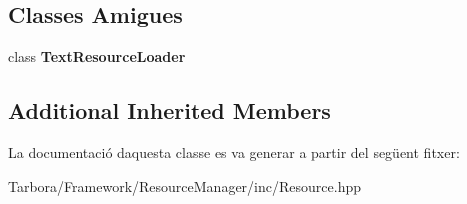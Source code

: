 \subsection*{Classes Amigues}
\begin{DoxyCompactItemize}
\item 
\mbox{\label{classTarbora_1_1TextResource_ad100d8767ed491d6e80636c2b83ac605}} 
class {\bfseries Text\+Resource\+Loader}
\end{DoxyCompactItemize}
\subsection*{Additional Inherited Members}


La documentació d\textquotesingle{}aquesta classe es va generar a partir del següent fitxer\+:\begin{DoxyCompactItemize}
\item 
Tarbora/\+Framework/\+Resource\+Manager/inc/Resource.\+hpp\end{DoxyCompactItemize}
